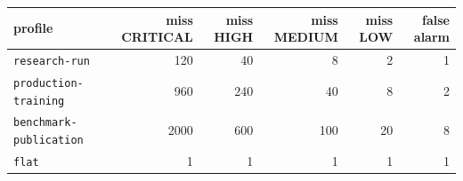 \begin{tabular}{@{}lrrrrr@{}}
\toprule
profile & miss CRITICAL & miss HIGH & miss MEDIUM & miss LOW & false alarm \\
\midrule
\texttt{research-run} & 120 & 40 & 8 & 2 & 1 \\
\texttt{production-training} & 960 & 240 & 40 & 8 & 2 \\
\texttt{benchmark-publication} & 2000 & 600 & 100 & 20 & 8 \\
\texttt{flat} & 1 & 1 & 1 & 1 & 1 \\
\bottomrule
\end{tabular}
